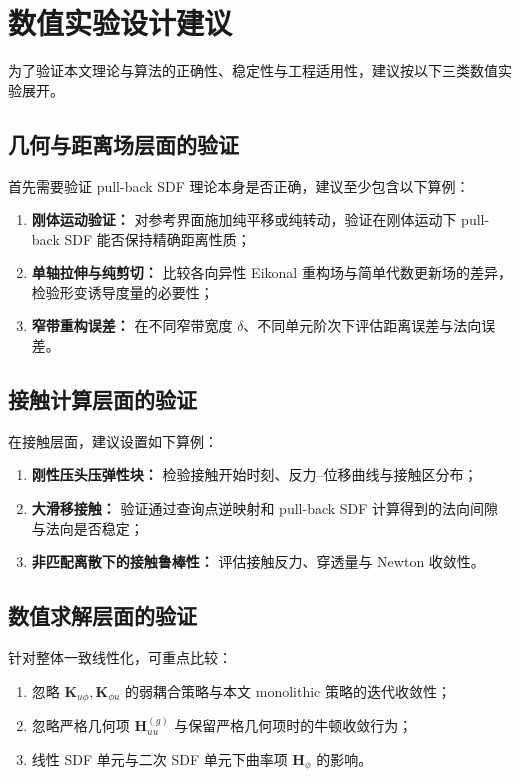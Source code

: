 \documentclass[12pt,a4paper]{ctexart}
\numberwithin{equation}{section}
\newcommand{\bH}{\bm{H}}
\begin{document}
\section{数值实验设计建议}\label{sec:numerics}

为了验证本文理论与算法的正确性、稳定性与工程适用性，建议按以下三类数值实验展开。

\subsection{几何与距离场层面的验证}

首先需要验证 pull-back SDF 理论本身是否正确，建议至少包含以下算例：
\begin{enumerate}[label=\arabic*)]
    \item \textbf{刚体运动验证：} 对参考界面施加纯平移或纯转动，验证在刚体运动下 pull-back SDF 能否保持精确距离性质；
    \item \textbf{单轴拉伸与纯剪切：} 比较各向异性 Eikonal 重构场与简单代数更新场的差异，检验形变诱导度量的必要性；
    \item \textbf{窄带重构误差：} 在不同窄带宽度 $\delta$、不同单元阶次下评估距离误差与法向误差。
\end{enumerate}

\subsection{接触计算层面的验证}

在接触层面，建议设置如下算例：
\begin{enumerate}[label=\arabic*)]
    \item \textbf{刚性压头压弹性块：} 检验接触开始时刻、反力--位移曲线与接触区分布；
    \item \textbf{大滑移接触：} 验证通过查询点逆映射和 pull-back SDF 计算得到的法向间隙与法向是否稳定；
    \item \textbf{非匹配离散下的接触鲁棒性：} 评估接触反力、穿透量与 Newton 收敛性。
\end{enumerate}

\subsection{数值求解层面的验证}

针对整体一致线性化，可重点比较：
\begin{enumerate}[label=\arabic*)]
    \item 忽略 $\bm{K}_{u\phi},\bm{K}_{\phi u}$ 的弱耦合策略与本文 monolithic 策略的迭代收敛性；
    \item 忽略严格几何项 $\bm{H}_{uu}^{(g)}$ 与保留严格几何项时的牛顿收敛行为；
    \item 线性 SDF 单元与二次 SDF 单元下曲率项 $\bH_\phi$ 的影响。
\end{enumerate}
\end{document}
